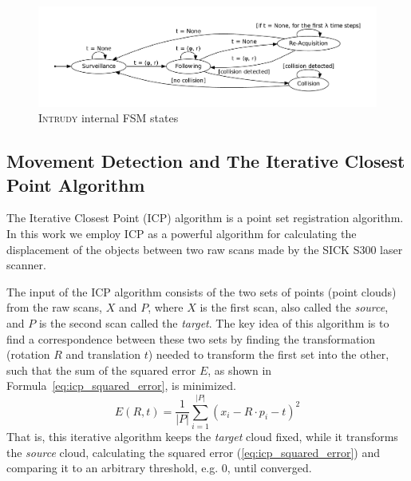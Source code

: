 \documentclass[12pt,a4paper]{scrartcl}
\newcommand{\intrudy}{\textsc{Intrudy}\xspace}
\begin{document}
	\begin{figure}[htc]
	\center
	\includegraphics[width=\textwidth]{img/fsm.pdf}
	\caption{\intrudy internal FSM states}
	\label{fig:intrudy_fsm_states}
	\end{figure}

\subsection{Movement Detection and The Iterative Closest Point Algorithm} %
\label{sub:the_iterative_closest_point_algorithm}

The Iterative Closest Point (ICP) algorithm is a point set registration algorithm\cite{ICP1992}. In this work we employ ICP as a powerful algorithm for calculating the displacement of the objects between two raw scans made by the SICK S300 laser scanner.

The input of the ICP algorithm consists of the two sets of points (point clouds) from the raw scans, $X$ and $P$, where $X$ is the first scan, also called the \textit{source}, and $P$ is the second scan called the \textit{target}. The key idea of this algorithm is to find a correspondence between these two sets by finding the transformation (rotation $R$ and translation $t$) needed to transform the first set into the other, such that the sum of the squared error $E$, as shown in Formula~\ref{eq:icp_squared_error}, is minimized.
\begin{equation} \label{eq:icp_squared_error}
E(R, t) = \frac{1}{\left|P\right|} \sum^{\left|P\right|}_{i=1} (x_i - R \cdot p_i -  t)^2
\end{equation}
That is, this iterative algorithm keeps the \textit{target} cloud fixed, while it transforms the \textit{source} cloud, calculating the squared error (\ref{eq:icp_squared_error}) and comparing it to an arbitrary threshold, e.g. 0, until converged.
\end{document}
